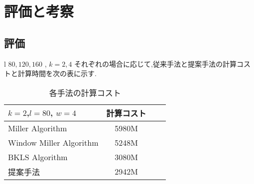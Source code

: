 
\chapter{評価と考察}
\section{評価}
l \approx $80,120,160$ , $k=2, 4$ それぞれの場合に応じて,従来手法と提案手法の計算コストと計算時間を次の表に示す.

\begin{table}[htbp]
 \begin{center}
  \begin{tabular}{|l|c|c|c|}
  \hline
  $k=2$,$l=80$, $w=4$ & 計算コスト \\
  \hline
  Miller Algorithm & 5980M \\
  \hline
  Window Miller Algorithm & 5248M \\
  \hline
  BKLS Algorithm &  3080M \\
  \hline
  提案手法 & 2942M \\
  \hline
  \end{tabular}
 \end{center}
 \caption{各手法の計算コスト}
\end{table}

